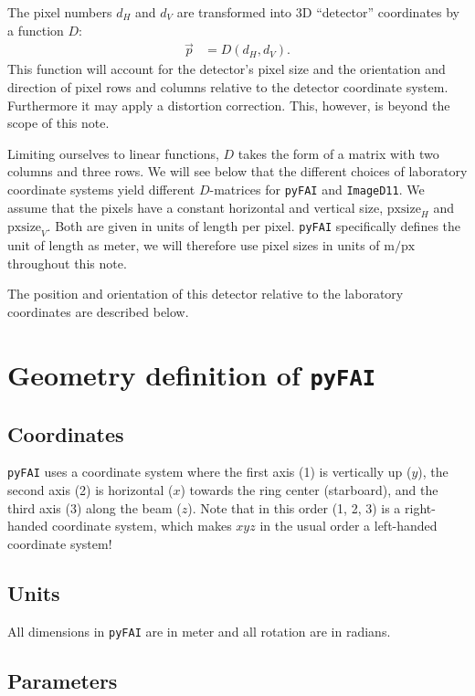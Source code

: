\documentclass[12pt]{article}
\begin{document}
The pixel numbers $d_H$ and $d_V$ are transformed into 3D ``detector''
coordinates by a function $D$:
\begin{align}
  \vec{p}
  & =
  D\left(d_H, d_V\right).
\end{align}
This function will account for the detector's pixel size and the
orientation and direction of pixel rows and columns relative to the
detector coordinate system. Furthermore it may apply a distortion
correction. This, however, is beyond the scope of this note.

Limiting ourselves to linear functions, $D$ takes the form of a matrix
with two columns and three rows. We will see below that the different
choices of laboratory coordinate systems yield different $D$-matrices
for \texttt{pyFAI} and \texttt{ImageD11}. We assume that the pixels
have a constant horizontal and vertical size, $\mathrm{pxsize}_H$ and
$\mathrm{pxsize}_V$. Both are given in units of length per
pixel. \texttt{pyFAI} specifically defines the unit of length as
meter, we will therefore use pixel sizes in units of
$\mathrm{m}/\mathrm{px}$ throughout this note.

The position and orientation of this detector relative to the
laboratory coordinates are described below.

\section{Geometry definition of \texttt{pyFAI}}

\subsection{Coordinates}

\texttt{pyFAI} uses a coordinate system where the first axis (1) is
vertically up ($y$), the second axis (2) is horizontal ($x$)
towards the ring center (starboard), and the third axis (3) along the
beam ($z$). Note that in this order (1, 2, 3) is a right-handed coordinate
system, which makes $xyz$ in the usual order a left-handed coordinate
system!

\subsection{Units}

All dimensions in \texttt{pyFAI} are in meter and all rotation are in
radians.

\subsection{Parameters}
\end{document}
